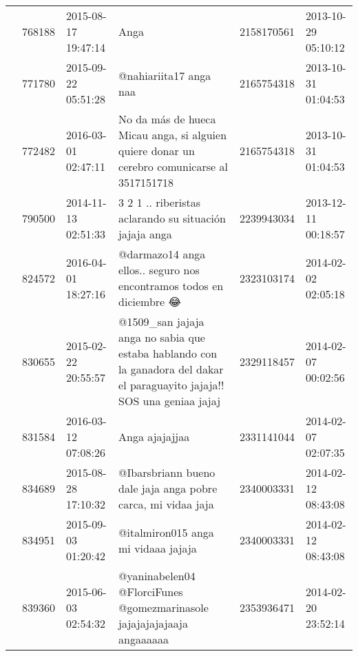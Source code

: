 \begin{tabular}{llllrl}
           & 768188  & 2015-08-17 19:47:14 &                                                                                                                                         Anga &  2158170561 & 2013-10-29 05:10:12 \\
           & 771780  & 2015-09-22 05:51:28 &                                                                                                                       @nahiariita17 anga naa &  2165754318 & 2013-10-31 01:04:53 \\
           & 772482  & 2016-03-01 02:47:11 &                                                  No da más de hueca Micau anga, si alguien quiere donar un cerebro comunicarse al 3517151718 &  2165754318 & 2013-10-31 01:04:53 \\
           & 790500  & 2014-11-13 02:51:33 &                                                                                       3 2 1 .. riberistas aclarando su situación jajaja anga &  2239943034 & 2013-12-11 00:18:57 \\
           & 824572  & 2016-04-01 18:27:16 &                                                                          @darmazo14 anga ellos.. seguro nos encontramos todos en diciembre 😂 &  2323103174 & 2014-02-02 02:05:18 \\
           & 830655  & 2015-02-22 20:55:57 &                    @1509\_san jajaja anga no sabia que estaba hablando con la ganadora del dakar el paraguayito jajaja!! SOS una geniaa jajaj &  2329118457 & 2014-02-07 00:02:56 \\
           & 831584  & 2016-03-12 07:08:26 &                                                                                                                               Anga ajajajjaa &  2331141044 & 2014-02-07 02:07:35 \\
           & 834689  & 2015-08-28 17:10:32 &                                                                                 @Ibarsbriann bueno dale jaja anga pobre carca, mi vidaa jaja &  2340003331 & 2014-02-12 08:43:08 \\
           & 834951  & 2015-09-03 01:20:42 &                                                                                                          @italmiron015 anga mi vidaaa jajaja &  2340003331 & 2014-02-12 08:43:08 \\
           & 839360  & 2015-06-03 02:54:32 &                                                                       @yaninabelen04 @FlorciFunes @gomezmarinasole jajajajajajaaja angaaaaaa &  2353936471 & 2014-02-20 23:52:14 \\

\end{tabular}
